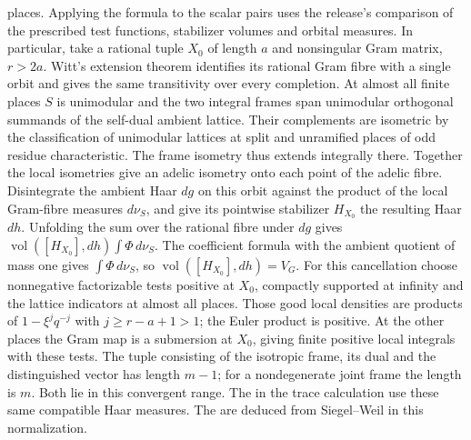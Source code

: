 places. Applying the formula to the scalar pairs uses the release's
comparison of the prescribed test functions, stabilizer volumes and
orbital measures. In particular, take a rational tuple \(X_0\) of
length \(a\) and nonsingular Gram matrix, \(r>2a\). Witt's extension
theorem identifies its rational Gram fibre with a single orbit and
gives the same transitivity over every completion. At almost all
finite places \(S\) is unimodular and the two integral frames span
unimodular orthogonal summands of the self-dual ambient lattice.
Their complements are isometric by the classification of unimodular
lattices at split and unramified places of odd residue characteristic.
The frame isometry thus extends integrally there. Together the local
isometries give an adelic isometry onto each point of the adelic fibre.
Disintegrate the ambient Haar \(dg\) on this orbit against the product
of the local Gram-fibre measures \(d\nu_S\), and give its pointwise
stabilizer \(H_{X_0}\) the resulting Haar \(dh\).
Unfolding the sum over the rational fibre under \(dg\) gives
\(\operatorname{vol}([H_{X_0}],dh)\int\Phi\,d\nu_S\).
The coefficient formula with the ambient quotient of mass one gives
\(\int\Phi\,d\nu_S\), so \(\operatorname{vol}([H_{X_0}],dh)=V_G\).
For this cancellation choose nonnegative factorizable tests positive
at \(X_0\), compactly supported at infinity and the lattice indicators
at almost all places. Those good local densities are products of
\(1-\xi^j q^{-j}\) with \(j\ge r-a+1>1\); the Euler product is
positive. At the other places the Gram map is a submersion at
\(X_0\), giving finite positive local integrals with these tests.
The tuple consisting of the isotropic frame, its dual and the
distinguished vector has length \(m-1\); for a nondegenerate joint
frame the length is \(m\). Both lie in this convergent range.
The 
in the trace calculation use these same compatible Haar measures.
The 
are deduced from Siegel--Weil in this normalization.

